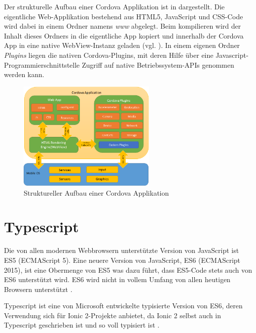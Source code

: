 Der strukturelle Aufbau einer Cordova Applikation ist in  dargestellt.
Die eigentliche Web-Applikation bestehend aus HTML5, JavaScript und CSS-Code wird dabei in einem Ordner namens \emph{www} abgelegt. Beim kompilieren wird der Inhalt dieses Ordners in die eigentliche App kopiert und innerhalb der Cordova App in eine native WebView-Instanz geladen (vgl. ). In einem eigenen Ordner \emph{Plugins} liegen die nativen Cordova-Plugins, mit deren Hilfe über eine Javascript-Programmierschnittstelle Zugriff auf native Betriebssystem-APIs genommen werden kann.
%
\begin{figure}[htb] 
	\centering
	\includegraphics[width=0.6\textwidth]{data/bilder/cordovaapparchitecture.png}
	\caption{Struktureller Aufbau einer Cordova Applikation \cite{cordovaApplicationArchitecture}}
	\label{fig:Cordovaapparchitecture}
\end{figure}
%
%
\section{Typescript}
%
Die von allen modernen Webbrowsern unterstützte Version von JavaScript ist ES5 (ECMAScript 5).
Eine neuere Version von JavaScript, ES6 (ECMAScript 2015), ist eine Obermenge von ES5 was dazu führt, dass ES5-Code stets auch von ES6 unterstützt wird. ES6 wird nicht in vollem Umfang von allen heutigen Browsern unterstützt \cite{compatTableES6}.

Typescript ist eine von Microsoft entwickelte typisierte Version von ES6, deren Verwendung sich für Ionic 2-Projekte anbietet, da Ionic 2 selbst auch in Typescript geschrieben ist und so voll typisiert ist \cite{ionic2Docu}.

